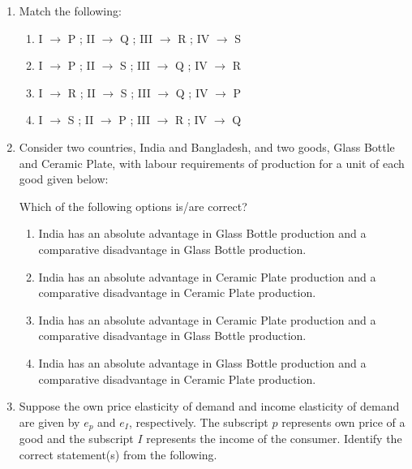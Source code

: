 \documentclass[12pt]{article}
\theoremstyle{remark}
\begin{document}
\begin{enumerate}
\begin{enumerate}
\begin{multicols}{2}
\end{multicols} \end{enumerate}
\hfill{}
\item 
Match the following: 
\vspace{0.2cm}
\begin{table}[H]
\centering

\caption{}
\label{Table 1.2}
\end{table}
\begin{enumerate} 
\item   I $\rightarrow$ P ; II $\rightarrow$ Q ; III $\rightarrow$ R ; IV $\rightarrow$ S 
\item   I $\rightarrow$ P ; II $\rightarrow$ S ; III $\rightarrow$ Q ; IV $\rightarrow$ R 
\item   I $\rightarrow$ R ; II $\rightarrow$ S ; III $\rightarrow$ Q ; IV $\rightarrow$ P 
\item   I $\rightarrow$ S ; II $\rightarrow$ P ; III $\rightarrow$ R ; IV $\rightarrow$ Q 
\end{enumerate}
\hfill{}
\item Consider two countries, India and Bangladesh, and two goods, Glass Bottle and Ceramic Plate, with labour requirements of production for a unit of each good given below:
\begin{centering}
\begin{table}[H]

\caption{}
\label{Table 1.3}
\end{table}
\end{centering}
Which of the following options is/are correct? \\
\begin{enumerate}
\item   India has an absolute advantage in Glass Bottle production and a comparative disadvantage in Glass Bottle production. 
\item   India has an absolute advantage in Ceramic Plate production and a comparative disadvantage in Ceramic Plate production.
\item   India has an absolute advantage in Ceramic Plate production and a comparative disadvantage in Glass Bottle production. 
\item   India has an absolute advantage in Glass Bottle production and a comparative disadvantage in Ceramic Plate production.
\end{enumerate}
\hfill{}
\item Suppose the own price elasticity of demand and income elasticity of demand are given by $e_p$ and $e_I$, respectively. The subscript $p$ represents own price of a good and the subscript $I$ represents the income of the consumer. Identify the correct statement(s) from the following. 

\end{enumerate}
\end{document}
